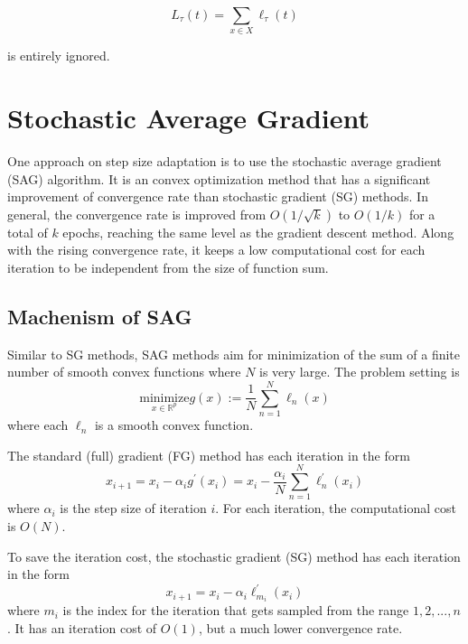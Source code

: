 \begin{equation}
    L_{\tau}(t) = \sum_{x \in X} \ell_{\tau}(t)
\end{equation}

is entirely ignored.


\graphicspath{{Figures/Smooth_func/}{./}} 


\section{Stochastic Average Gradient}
One approach on step size adaptation is to use the stochastic average gradient (SAG)\cite{schmidtMinimizingFiniteSums2016} algorithm. It is an convex optimization method that has a significant improvement of convergence rate than stochastic gradient (SG) methods. In general, the convergence rate is improved from $O(1/\sqrt{k})$ to $O(1/k)$ for a total of $k$ epochs, reaching the same level as the gradient descent method. Along with the rising convergence rate, it keeps a low computational cost for each iteration to be independent from the size of function sum.

\subsection{Machenism of SAG}
Similar to SG methods, SAG methods aim for minimization of the sum of a finite number of smooth convex functions where $N$ is very large. The problem setting is
\begin{equation}
\underset{x \in \mathbb{R}^p}{\text{minimize}} g(x) := \frac{1}{N}\sum^N_{n=1} \ell_n(x)
\end{equation}
where each $\ell_n$ is a smooth convex function.

The standard (full) gradient (FG) method has each iteration in the form
\begin{equation}
x_{i+1} = x_i - \alpha_i g^{\prime} (x_i) = x_i - \frac{\alpha_i}{N}\sum^N_{n=1} \ell_n^{\prime}(x_i)
\end{equation}
where $\alpha_i$ is the step size of iteration $i$. For each iteration, the computational cost is $O(N)$.

To save the iteration cost, the stochastic gradient (SG) method has each iteration in the form
\begin{equation}
x_{i+1} = x_i - \alpha_i \ell_{m_i}^{\prime} (x_i)
\end{equation}
where $m_i$ is the index for the iteration that gets sampled from the range {$1, 2,...,n$}. It has an iteration cost of $O(1)$, but a much lower convergence rate.

